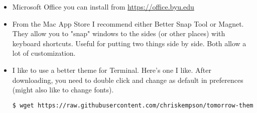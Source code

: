 \begin{itemize}
\item Microsoft Office you can install from \url{https://office.byu.edu}


\item From the Mac App Store I recommend either Better Snap Tool or Magnet.  They allow you to "snap" windows to the sides (or other places) with keyboard shortcuts. Useful for putting two things side by side.  Both allow a lot of customization.

\item I like to use a better theme for Terminal.  Here's one I like.  After downloading, you need to double click and change as default in preferences (might also like to change fonts).
\begin{lstlisting}[language=bash]
$ wget https://raw.githubusercontent.com/chriskempson/tomorrow-theme/master/OS%20X%20Terminal/Tomorrow%20Night.terminal
\end{lstlisting}

\end{itemize}


